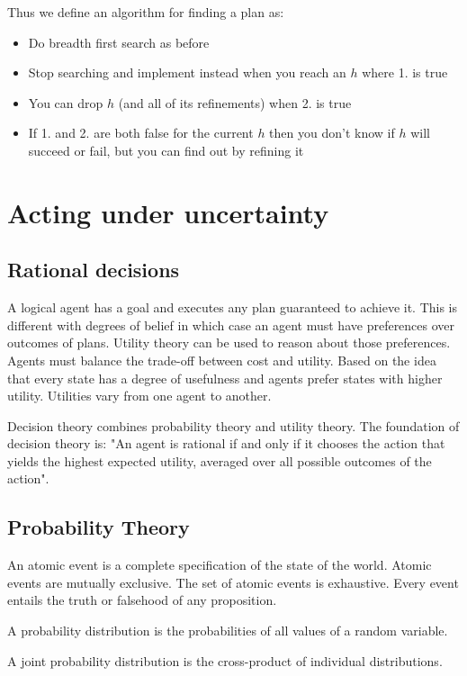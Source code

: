 \documentclass{article}
\begin{document}
Thus we define an algorithm for finding a plan as:
\begin{itemize}
    \item Do breadth first search as before
    \item Stop searching and implement instead when you reach an $h$ where 1. is true
    \item You can drop $h$ (and all of its refinements) when 2. is true
    \item If 1. and 2. are both false for the current $h$ then you don't know if $h$ will succeed or fail, but you can find out by refining it
\end{itemize}

\section{Acting under uncertainty}

\subsection{Rational decisions}

A logical agent has a goal and executes any plan guaranteed to achieve it. This is different with degrees of belief in which case an agent must have preferences over outcomes of plans. Utility theory can be used to reason about those preferences. Agents must balance the trade-off between cost and utility. Based on the idea that every state has a degree of usefulness and agents prefer states with higher utility. Utilities vary from one agent to another.

Decision theory combines probability theory and utility theory. The foundation of decision theory is: "An agent is rational if and only if it chooses the action that yields the highest expected utility, averaged over all possible outcomes of the action".

\subsection{Probability Theory}

An atomic event is a complete specification of the state of the world. Atomic events are mutually exclusive. The set of atomic events is exhaustive. Every event entails the truth or falsehood of any proposition. 

A probability distribution is the probabilities of all values of a random variable. 

A joint probability distribution is the cross-product of individual distributions.
\end{document}
